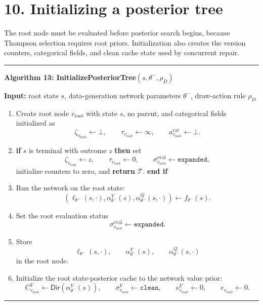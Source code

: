 \documentclass[11pt]{article}
\newcommand{\Tree}{\mathcal{T}}
\newcommand{\DirObj}{\mathsf{Dir}}
\newenvironment{algorithmblock}[1]
{
  \par\medskip
  \noindent\hrule\par\smallskip
  \noindent\textbf{#1}
  \par\smallskip
}
{
  \par\smallskip\noindent\hrule\par\medskip
}
\newcommand{\Input}{\textbf{Input: }}
\newcommand{\Return}{\textbf{return }}
\newcommand{\If}{\textbf{if }}
\newcommand{\Then}{\textbf{ then }}
\newcommand{\EndIf}{\textbf{end if}}
\begin{document}
\section*{10. Initializing a posterior tree}

The root node must be evaluated before posterior search begins, because
Thompson selection requires root priors. Initialization also creates the version
counters, categorical fields, and clean cache state used by concurrent repair.

\begin{algorithmblock}{Algorithm 13: InitializePosteriorTree\((s,\theta^-,\rho_D)\)}

\Input root state \(s\), data-generation network parameters \(\theta^-\), draw-action rule \(\rho_D\)

\begin{enumerate}[leftmargin=2em]
  \item Create root node \(v_{\mathrm{root}}\) with state \(s\), no parent, and
  categorical fields initialized as
  \[
  \zeta_{v_{\mathrm{root}}}\gets\bot,
  \qquad
  \tau_{v_{\mathrm{root}}}\gets\infty,
  \qquad
  a_{v_{\mathrm{root}}}^{\mathrm{cat}}\gets\bot.
  \]

  \item \If \(s\) is terminal with outcome \(z\) \Then set
  \[
  \zeta_{v_{\mathrm{root}}}\gets z,
  \qquad
  \tau_{v_{\mathrm{root}}}\gets0,
  \qquad
  \sigma^{\mathrm{eval}}_{v_{\mathrm{root}}}\gets\texttt{expanded},
  \]
  initialize counters to zero, and \Return \(\Tree\). \EndIf

  \item Run the network on the root state:
  \[
  \left(
  \ell_{\theta^-}(s,\cdot),
  \alpha_{\theta^-}^V(s),
  \alpha_{\theta^-}^Q(s,\cdot)
  \right)
  \gets
  f_{\theta^-}(s).
  \]

  \item Set the root evaluation status
  \[
  \sigma^{\mathrm{eval}}_{v_{\mathrm{root}}}\gets\texttt{expanded}.
  \]

  \item Store
  \[
  \ell_{\theta^-}(s,\cdot),
  \qquad
  \alpha_{\theta^-}^V(s),
  \qquad
  \alpha_{\theta^-}^Q(s,\cdot)
  \]
  in the root node.

  \item Initialize the root state-posterior cache to the network value prior:
  \[
  C^V_{v_{\mathrm{root}}}\gets \DirObj(\alpha_{\theta^-}^V(s)),
  \qquad
  \sigma^V_{v_{\mathrm{root}}}\gets\texttt{clean},
  \qquad
  \nu^V_{v_{\mathrm{root}}}\gets 0,
  \qquad
  e_{v_{\mathrm{root}}}\gets 0.
  \]


\end{enumerate}
\end{algorithmblock}
\end{document}
